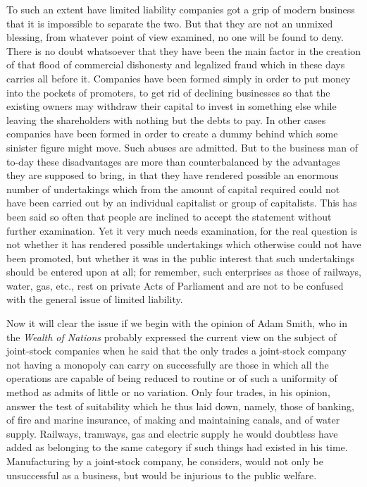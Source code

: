\documentclass{book}
\begin{document}
To such an extent have limited liability companies got a grip of modern business that it is impossible to separate the two. But that they are not an unmixed blessing, from whatever point of view examined, no one will be found to deny. There is no doubt whatsoever that they have been the main factor in the creation of that flood of commercial dishonesty and legalized fraud which in these days carries all before it. Companies have been formed simply in order to put money into the pockets of promoters, to get rid of declining businesses so that the existing owners may withdraw their capital to invest in something else while leaving the shareholders with nothing but the debts to pay. In other cases companies have been formed in order to create a dummy behind which some sinister figure might move. Such abuses are admitted. But to the business man of to-day these disadvantages are more than counterbalanced by the advantages they are supposed to bring, in that they have rendered possible an enormous number of undertakings which from the amount of capital required could not have been carried out by an individual capitalist or group of capitalists. This has been said so often that people are inclined to accept the statement without further examination. Yet it very much needs examination, for the real question is not whether it has rendered possible undertakings which otherwise could not have been promoted, but whether it was in the public interest that such undertakings should be entered upon at all; for remember, such enterprises as those of railways, water, gas, etc., rest on private Acts of Parliament and are not to be confused with the general issue of limited liability.

Now it will clear the issue if we begin with the opinion of Adam Smith, who in the \emph{Wealth of Nations} probably expressed the current view on the subject of joint-stock companies when he said that the only trades a joint-stock company not having a monopoly can carry on successfully are those in which all the operations are capable of being reduced to routine or of such a uniformity of method as admits of little or no variation. Only four trades, in his opinion, answer the test of suitability which he thus laid down, namely, those of banking, of fire and marine insurance, of making and maintaining canals, and of water supply. Railways, tramways, gas and electric supply he would doubtless have added as belonging to the same category if such things had existed in his time. Manufacturing by a joint-stock company, he considers, would not only be unsuccessful as a business, but would be injurious to the public welfare.
\end{document}
